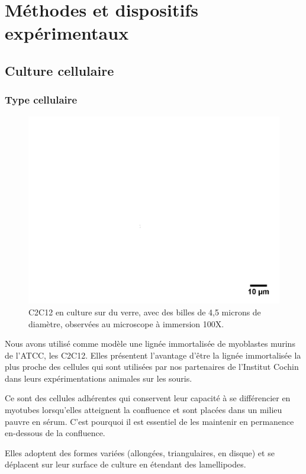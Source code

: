 \documentclass{report}
\begin{document}
\chapter{Méthodes et dispositifs expérimentaux}

\section{Culture cellulaire}
	\subsection{Type cellulaire}
	
	\begin{figure}
	\includegraphics[scale=0.15]{c68-avt.png}
	\caption{C2C12 en culture sur du verre, avec des billes de 4,5 microns de diamètre, observées au microscope à immersion 100X.}
	\end{figure}
	
	Nous avons utilisé comme modèle une lignée immortalisée de myoblastes murins de l'ATCC, les C2C12. Elles présentent l'avantage d'être la lignée immortalisée la plus proche des cellules qui sont utilisées par nos partenaires de l'Institut Cochin dans leurs expérimentations animales sur les souris. 
	
	Ce sont des cellules adhérentes qui conservent leur capacité à se différencier en myotubes lorsqu'elles atteignent la confluence et sont placées dans un milieu pauvre en sérum. C'est pourquoi il est essentiel de les maintenir en permanence en-dessous de la confluence. 
	
	Elles adoptent des formes variées (allongées, triangulaires, en disque) et se déplacent sur leur surface de culture en étendant des lamellipodes. 
	
\end{document}
